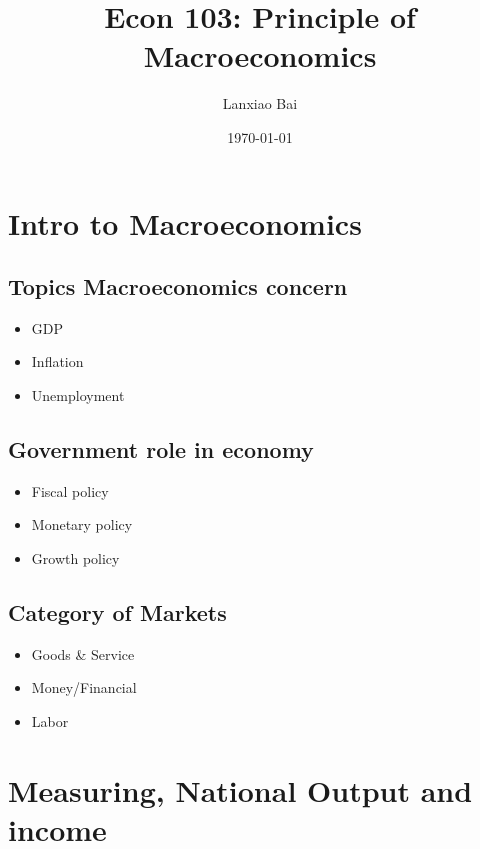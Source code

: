 \documentclass[11pt]{article}
\title{Econ 103: Principle of Macroeconomics}
\author{Lanxiao Bai}
\date{\today}
\begin{document}
\maketitle
\newpage
\tableofcontents
\newpage

\section{Intro to Macroeconomics}
\subsection{Topics Macroeconomics concern}
    \begin{itemize}
        \item GDP
        \item Inflation
        \item Unemployment
    \end{itemize}
\subsection{Government role in economy}
    \begin{itemize}
        \item Fiscal policy 
        \item Monetary policy
        \item Growth policy
    \end{itemize}
\subsection{Category of Markets}
    \begin{itemize}
        \item Goods \& Service
        \item Money/Financial
        \item Labor
    \end{itemize}

\section{Measuring, National Output and income}
\end{document}
